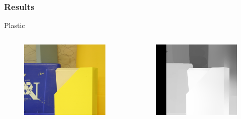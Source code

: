 \documentclass{beamer}
\begin{document}
\begin{frame}
\frametitle{Results}
Plastic
\begin{columns}[c] %

\begin{figure}
\includegraphics[width=0.7\linewidth]{../program/dataset/Plastic/view1.png}
\end{figure}

\begin{figure}
\includegraphics[width=0.7\linewidth]{../program/Result/Plastic.png}
\end{figure}

\end{columns}
\end{frame}

\end{document}
